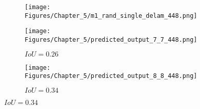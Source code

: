 \begin{figure} [h!]
	\centering
	\begin{subfigure}[b]{0.32\textwidth}
		\centering
		\texttt{[image: Figures/Chapter\_5/m1\_rand\_single\_delam\_448.png]}
		\caption{}
		\label{fig:GT_case_448}
	\end{subfigure}	
	\hfill
	\begin{subfigure}[b]{0.32\textwidth}
		\centering
		\texttt{[image: Figures/Chapter\_5/predicted\_output\_7\_7\_448.png]}
		\caption{\(IoU=0.26\)}
		\label{fig:pred_7_7_case_448}
	\end{subfigure}
	\hfill
	\begin{subfigure}[b]{0.32\textwidth}
		\centering
		\texttt{[image: Figures/Chapter\_5/predicted\_output\_8\_8\_448.png]}
		\caption{\(IoU=0.34\)}
		\label{fig:pred_8_8_case_448}
	\end{subfigure}	


\end{figure}
